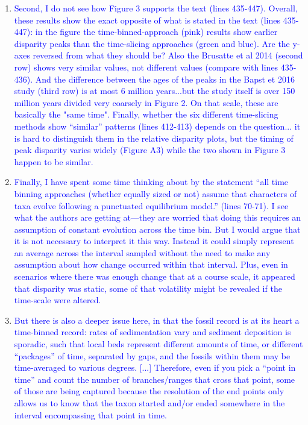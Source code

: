 \documentclass[12pt,letterpaper]{article}
\begin{document}
\begin{enumerate}
\item{\textcolor{blue}{Second, I do not see how Figure 3 supports the text (lines 435-447). Overall, these results show the exact opposite of what is stated in the text (lines 435-447): in the figure the time-binned-approach (pink) results show earlier disparity peaks than the time-slicing approaches (green and blue). Are the y-axes reversed from what they should be? Also the Brusatte et al 2014 (second row) shows very similar values, not different values (compare with lines 435-436). And the difference between the ages of the peaks in the Bapst et 2016 study (third row) is at most 6 million years...but the study itself is over 150 million years divided very coarsely in Figure 2.  On that scale, these are basically the "same time". Finally, whether the six different time-slicing methods show ``similar'' patterns (lines 412-413) depends on the question... it is hard to distinguish them in the relative disparity plots, but the timing of peak disparity varies widely (Figure A3) while the two shown in Figure 3 happen to be similar.}}



\item{\textcolor{blue}{Finally, I have spent some time thinking about by the statement ``all time binning approaches (whether equally sized or not) assume that characters of taxa evolve following a punctuated equilibrium model.'' (lines 70-71). I see what the authors are getting at—they are worried that doing this requires an assumption of constant evolution across the time bin. But I would argue that it is not necessary to interpret it this way. Instead it could simply represent an average across the interval sampled without the need to make any assumption about how change occurred within that interval. Plus, even in scenarios where there was enough change that at a course scale, it appeared that disparity was static, some of that volatility might be revealed if the time-scale were altered.}}



\item{\textcolor{blue}{But there is also a deeper issue here, in that the fossil record is at its heart a time-binned record: rates of sedimentation vary and sediment deposition is sporadic, such that local beds represent different amounts of time, or different ``packages'' of time, separated by gaps, and the fossils within them may be time-averaged to various degrees. [...] Therefore, even if you pick a ``point in time'' and count the number of branches/ranges that cross that point, some of those are being captured because the resolution of the end points only allows us to know that the taxon started and/or ended somewhere in the interval encompassing that point in time.}}


\end{enumerate}
\end{document}
